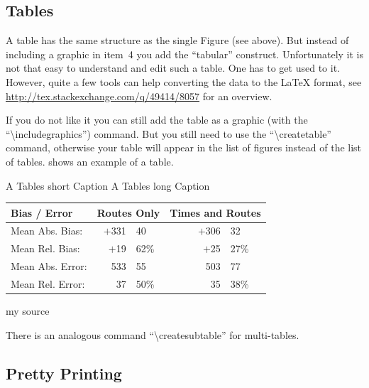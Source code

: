 \subsection{Tables} \label{sec:compStructs-Tables}

A table has the same structure as the single Figure (see above). But
instead of including a graphic in item~4 you add the ``tabular''
construct. Unfortunately it is not that easy to understand and edit such a table. One has
to get used to it. However, quite a few tools can help converting the data
to the \LaTeX{} format, see \url{http://tex.stackexchange.com/q/49414/8057}
for an overview.

If you do not like it you can still add the table
as a graphic (with the ``\textbackslash{}includegraphics'') command.
But you still need to use the ``\textbackslash{}createtable'' command,
otherwise your table will appear
in the list of figures instead of the list of tables.
 shows an example of a table.

\createtable%
{A Tables short Caption}%
{A Tables long Caption}%
{\label{tab:labelOfTheTable}}%
{%
  \begin{tabular}[c]{lr@{.}lcr@{.}l}
    \toprule
    Bias / Error     & \multicolumn{2}{c}{Routes Only} &
\multicolumn{3}{c}{Times and Routes} \\
    \midrule
    Mean Abs. Bias:  & $+$331&40                        && $+$306&32  
                         \\
    Mean Rel. Bias:  &  $+$19&62\%                      &&  $+$25&27\%
                         \\
    \midrule
    Mean Abs. Error: &    533&55                        &&    503&77  
                         \\
    Mean Rel. Error: &     37&50\%                      &&     35&38\%
                         \\
    \bottomrule
  \end{tabular}
}%
{my source}

There is an analogous command ``\textbackslash{}createsubtable'' for multi-tables.

\subsection{Pretty Printing}

